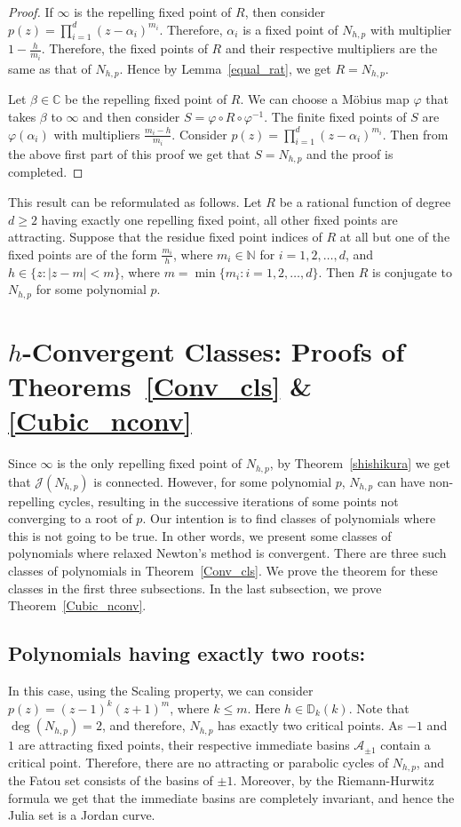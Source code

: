\documentclass[12pt]{article}
\numberwithin{equation}{section}
\begin{document}
\begin{proof}
If $\infty$ is the repelling fixed point of $R$, then consider $p(z)=\prod_{i=1}^{d}(z-\alpha_i)^{m_i}$. Therefore, $\alpha_i$ is a fixed point of $N_{h,p}$ with multiplier $1-\frac{h}{m_i}$. Therefore, the fixed points of $R$ and their respective multipliers are the same as that of $N_{h,p}$. Hence by Lemma~\ref{equal_rat}, we get $R=N_{h,p}$.
\par
Let $\beta\in \mathbb{C}$ be the repelling fixed point of $R$. We can choose a M\"{o}bius map $\varphi$ that takes $\beta$ to $\infty$ and then consider $S=\varphi\circ R\circ \varphi^{-1}$. The finite fixed points of $S$ are $\varphi(\alpha_i)$ with multipliers $\frac{m_i-h}{m_i}$. Consider $p(z)=\prod_{i=1}^{d}(z-\alpha_i)^{m_i}.$ Then from the above first part of this proof we get that $S=N_{h,p}$ and the proof is completed.
\end{proof}
This result can be reformulated as follows. Let $R$ be a rational function of degree $d\geq 2$ having exactly one repelling fixed point, all other fixed points are attracting. Suppose that the residue fixed point indices of $R$ at all but one of the fixed points are of the form $\frac{m_i}{h}$, where $m_i\in \mathbb{N}$ for $i=1,2,\dots, d$, and $h\in \{z:|z-m|<m\}$, where $m=\min\{m_i: i=1,2,\dots, d\}$. Then $R$ is conjugate to $N_{h,p}$ for some polynomial $p$.
\section{$h$-Convergent Classes: Proofs of Theorems~\ref{Conv_cls} \& \ref{Cubic_nconv}}\label{Sec_CC}
Since $\infty$ is the only repelling fixed point of $N_{h, p}$, by Theorem~\ref{shishikura} we get that $\mathcal{J}\left(N_{h, p}\right)$ is connected. However, for some polynomial $p$, $N_{h,p}$ can have non-repelling cycles, resulting in the successive iterations of some points not converging to a root of $p$. Our intention is to find classes of polynomials where this is not going to be true. In other words, we present some classes of polynomials where relaxed Newton's method is convergent. There are three such classes of polynomials in Theorem~\ref{Conv_cls}. We prove the theorem for these classes in the first three subsections. In the last subsection, we prove Theorem~\ref{Cubic_nconv}.
\subsection{Polynomials having exactly two roots:}
In this case, using the Scaling property, we can consider $p(z)=(z-1)^{k}(z+1)^{m}$, where $k\leq m$.
Here $h \in \mathbb{D}_{k}(k)$.
Note that $\deg(N_{h, p})=2$, and therefore, $N_{h, p}$ has exactly two critical points. As $-1$ and $1$ are attracting fixed points, their respective immediate basins $\mathcal{A}_{\pm 1}$ contain a critical point. Therefore, there are no attracting or parabolic cycles of $N_{h,p}$, and the Fatou set consists of the basins of $\pm 1$. Moreover, by the Riemann-Hurwitz formula we get that the immediate basins are completely invariant, and hence the Julia set is a Jordan curve.
\end{document}
